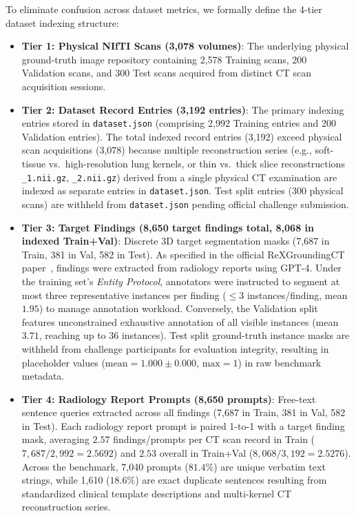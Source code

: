 \documentclass[11pt,a4paper]{article}
\begin{document}
To eliminate confusion across dataset metrics, we formally define the 4-tier dataset indexing structure:
\begin{itemize}
    \item \textbf{Tier 1: Physical NIfTI Scans (3,078 volumes)}: The underlying physical ground-truth image repository containing 2,578 Training scans, 200 Validation scans, and 300 Test scans acquired from distinct CT scan acquisition sessions.
    \item \textbf{Tier 2: Dataset Record Entries (3,192 entries)}: The primary indexing entries stored in \texttt{dataset.json} (comprising 2,992 Training entries and 200 Validation entries). The total indexed record entries (3,192) exceed physical scan acquisitions (3,078) because multiple reconstruction series (e.g., soft-tissue vs.\ high-resolution lung kernels, or thin vs.\ thick slice reconstructions \texttt{\_1.nii.gz}, \texttt{\_2.nii.gz}) derived from a single physical CT examination are indexed as separate entries in \texttt{dataset.json}. Test split entries (300 physical scans) are withheld from \texttt{dataset.json} pending official challenge submission.
    \item \textbf{Tier 3: Target Findings (8,650 target findings total, 8,068 in indexed Train+Val)}: Discrete 3D target segmentation masks (7,687 in Train, 381 in Val, 582 in Test). As specified in the official ReXGroundingCT paper~\cite{baharoon2025rexgroundingct}, findings were extracted from radiology reports using GPT-4. Under the training set's \textit{Entity Protocol}, annotators were instructed to segment at most three representative instances per finding ($\le 3$ instances/finding, mean $1.95$) to manage annotation workload. Conversely, the Validation split features unconstrained exhaustive annotation of all visible instances (mean $3.71$, reaching up to 36 instances). Test split ground-truth instance masks are withheld from challenge participants for evaluation integrity, resulting in placeholder values ($\text{mean} = 1.000 \pm 0.000$, $\text{max} = 1$) in raw benchmark metadata.
    \item \textbf{Tier 4: Radiology Report Prompts (8,650 prompts)}: Free-text sentence queries extracted across all findings (7,687 in Train, 381 in Val, 582 in Test). Each radiology report prompt is paired 1-to-1 with a target finding mask, averaging $2.57$ findings/prompts per CT scan record in Train ($7,687 / 2,992 = 2.5692$) and $2.53$ overall in Train+Val ($8,068 / 3,192 = 2.5276$). Across the benchmark, 7,040 prompts ($81.4\%$) are unique verbatim text strings, while 1,610 ($18.6\%$) are exact duplicate sentences resulting from standardized clinical template descriptions and multi-kernel CT reconstruction series.
\end{itemize}
\end{document}
